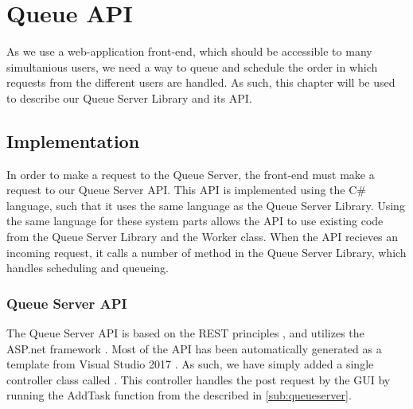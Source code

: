 \chapter{Queue \acs{API}}\label{queueAPI}
As we use a web-application front-end, which should be accessible to many
simultanious users, we need a way to queue and schedule the order in which
requests from the different users are handled. As such, this chapter will be
used to describe our Queue Server Library and its \ac{API}.

\section{Implementation}
In order to make a request to the Queue Server, the front-end must make a
request to our Queue Server \ac{API}. This \ac{API} is implemented using the 
C\# language, such that it uses the same language as the Queue Server Library.
Using the same language for these system parts allows the \ac{API} to use
existing code from the Queue Server Library and the Worker class. When the API
recieves an incoming request, it calls a number of method in the Queue Server
Library, which handles scheduling and queueing.

\subsection{Queue Server \ac{API}}
The Queue Server \ac{API} is based on the \ac{REST} principles
\citep{principlesREST}, and utilizes the ASP.net framework
\citep{aspNEToverview}. Most of the API has been automatically generated as a
 template from Visual Studio 2017
\citep{vsMainPage}. As such, we have simply added a single controller class
called . This controller handles the post
request by the GUI by running the AddTask function from the
 described in \autoref{sub:queueserver}.

